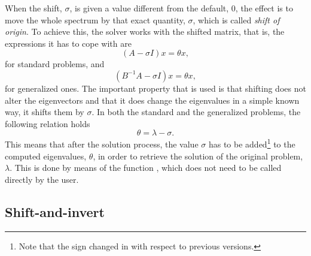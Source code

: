 When the shift, $\sigma$, is given a value different from the default, 0, the effect is to move the whole spectrum by that exact quantity, $\sigma$, which is called \emph{shift of origin}. To achieve this, the solver works with the shifted matrix, that is, the expressions it has to cope with are
\begin{equation}(A-\sigma I)x=\theta x,\end{equation}
for standard problems, and 
\begin{equation}(B^{-1}A-\sigma I) x=\theta x,\end{equation}
for generalized ones. The important property that is used is that shifting does not alter the eigenvectors and that it does change the eigenvalues in a simple known way, it shifts them by $\sigma$. In both the standard and the generalized problems, the following relation holds 
\begin{equation}\theta=\lambda-\sigma.\end{equation}
This means that after the solution process, the value $\sigma$ has to be added\footnote{Note that the sign changed in  with respect to previous versions.} to the computed eigenvalues, $\theta$, in order to retrieve the solution of the original problem, $\lambda$. This is done by means of the function , which does not need to be called directly by the user.

\subsection{Shift-and-invert}

